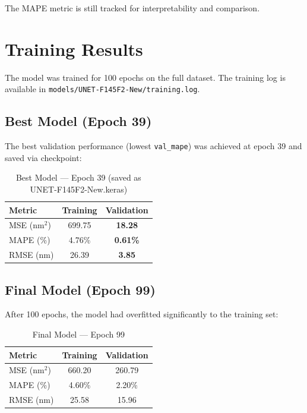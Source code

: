 \documentclass[11pt,a4paper]{article}
\begin{document}
The MAPE metric is still tracked for interpretability and comparison.

\section{Training Results}

The model was trained for 100 epochs on the full dataset. The training log is available in \texttt{models/UNET-F145F2-New/training.log}.

\subsection{Best Model (Epoch 39)}

The best validation performance (lowest \texttt{val\_mape}) was achieved at epoch 39 and saved via checkpoint:

\begin{table}[H]
\centering
\caption{Best Model — Epoch 39 (saved as UNET-F145F2-New.keras)}
\begin{tabular}{lcc}
\toprule
\textbf{Metric} & \textbf{Training} & \textbf{Validation} \\
\midrule
MSE (nm$^2$) & 699.75 & \textbf{18.28} \\
MAPE (\%)  & 4.76\% & \textbf{0.61\%} \\
RMSE (nm)  & 26.39 & \textbf{3.85} \\
\bottomrule
\end{tabular}
\end{table}

\subsection{Final Model (Epoch 99)}

After 100 epochs, the model had overfitted significantly to the training set:

\begin{table}[H]
\centering
\caption{Final Model — Epoch 99}
\begin{tabular}{lcc}
\toprule
\textbf{Metric} & \textbf{Training} & \textbf{Validation} \\
\midrule
MSE (nm$^2$) & 660.20 & 260.79 \\
MAPE (\%)  & 4.60\% & 2.20\% \\
RMSE (nm)  & 25.58 & 15.96 \\
\bottomrule
\end{tabular}
\end{table}
\end{document}
